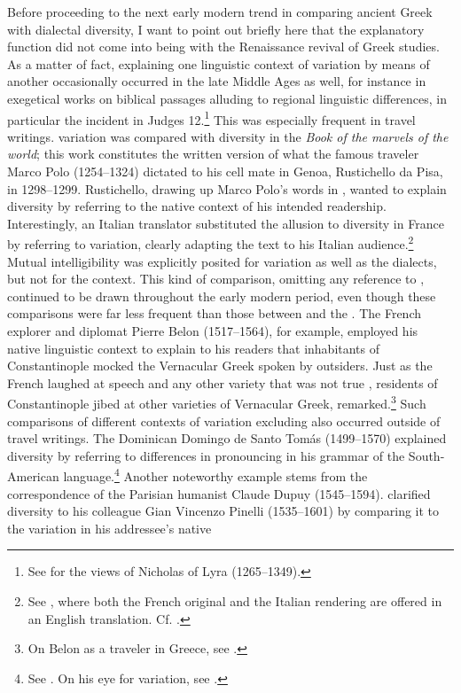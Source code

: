 Before proceeding to the next early modern trend in comparing ancient Greek with  dialectal diversity, I want to point out briefly here that the explanatory function did not come into being with the Renaissance revival of Greek studies. As a matter of fact, explaining one linguistic context of variation by means of another occasionally occurred in the late Middle Ages as well, for instance in exegetical works on biblical passages alluding to regional linguistic differences, in particular the  incident in Judges 12.\footnote{See \citet[199--200]{VanRooy2018b} for the views of Nicholas of Lyra (1265–1349).} This was especially frequent in travel writings.  variation was compared with  diversity in the \textit{Book of the marvels of the world}; this work constitutes the written version of what the famous  traveler Marco Polo (1254–1324) dictated to his cell mate in Genoa, Rustichello da Pisa, in 1298–1299. Rustichello, drawing up Marco Polo’s words in , wanted to explain  diversity by referring to the native context of his intended readership. Interestingly, an Italian translator substituted the allusion to diversity in France by referring to  variation, clearly adapting the text to his Italian audience.\footnote{See \citet[157]{Polo1938}, where both the French original and the Italian rendering are offered in an English translation. Cf. \citet[855]{Borst1959}.} Mutual intelligibility was explicitly posited for  variation as well as the  dialects, but not for the  context. This kind of comparison, omitting any reference to , continued to be drawn throughout the early modern period, even though these comparisons were far less frequent than those between  and the . The French explorer and diplomat Pierre Belon (1517–1564), for example, employed his native linguistic context to explain to his readers that inhabitants of Constantinople mocked the Vernacular Greek spoken by outsiders. Just as the French laughed at  speech and any other  variety that was not true , residents of Constantinople jibed at other varieties of Vernacular Greek, \citet[5\textsc{\textsuperscript{v}}]{Belon1553} remarked.\footnote{On Belon as a traveler in Greece, see \citet[esp. 122]{Vingopoulou2004}.} Such comparisons of different contexts of variation excluding  also occurred outside of travel writings. The  Dominican Domingo de Santo Tomás (1499–1570) explained  diversity by referring to  differences in pronouncing  in his grammar of the South-American language.\footnote{See \citet[1\textsc{\textsuperscript{v}}]{Santo1560}. On his eye for variation, see \citet[140]{Calvo2005}.} Another noteworthy example stems from the correspondence of the Parisian humanist Claude Dupuy (1545–1594). \citet[274]{Dupuy2001} clarified  diversity to his  colleague Gian Vincenzo Pinelli (1535–1601) by comparing it to the variation in his addressee’s native  